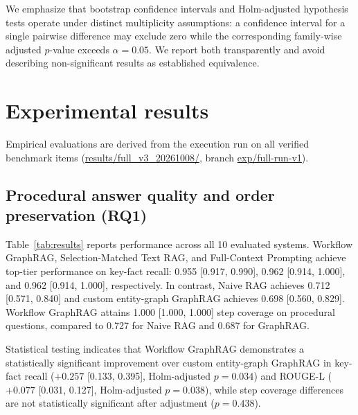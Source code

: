 \documentclass[preprint,10pt]{elsarticle}
\begin{document}
We emphasize that bootstrap confidence intervals and Holm-adjusted hypothesis tests operate under distinct multiplicity assumptions: a confidence interval for a single pairwise difference may exclude zero while the corresponding family-wise adjusted $p$-value exceeds $\alpha = 0.05$. We report both transparently and avoid describing non-significant results as established equivalence.

\section{Experimental results}
\label{sec:results}

Empirical evaluations are derived from the execution run on all \nVerified{} verified benchmark items (\url{results/full_v3_20261008/}, branch \url{exp/full-run-v1}).

\subsection{Procedural answer quality and order preservation (RQ1)}
Table~\ref{tab:results} reports performance across all 10 evaluated systems. Workflow GraphRAG, Selection-Matched Text RAG, and Full-Context Prompting achieve top-tier performance on key-fact recall: 0.955 [0.917, 0.990], 0.962 [0.914, 1.000], and 0.962 [0.914, 1.000], respectively. In contrast, Naive RAG achieves 0.712 [0.571, 0.840] and custom entity-graph GraphRAG achieves 0.698 [0.560, 0.829]. Workflow GraphRAG attains 1.000 [1.000, 1.000] step coverage on procedural questions, compared to 0.727 for Naive RAG and 0.687 for GraphRAG.

\begin{table}[!htbp]
\centering
\caption{Summary of evaluation results across ten system configurations. Key-fact recall (KFR) and false refusal rate are evaluated on 35 answerable questions; procedural metrics (Coverage, TIR, AMR) on 11 procedural questions; refusal accuracy on 5 unanswerable questions; and prompt tokens on all 40 questions. Values are point estimates; full bootstrap 95\% confidence intervals are reported in Supplementary Table~S1. TIR: Topological Inversion Rate; AMR: Actor Mismatch Rate.}
\label{tab:results}
\small
\setlength{\tabcolsep}{2pt}
\resizebox{\textwidth}{!}{%
}
\end{table}

Statistical testing indicates that Workflow GraphRAG demonstrates a statistically significant improvement over custom entity-graph GraphRAG in key-fact recall ($+0.257$ [0.133, 0.395], Holm-adjusted $p=0.034$) and ROUGE-L ($+0.077$ [0.031, 0.127], Holm-adjusted $p=0.038$), while step coverage differences are not statistically significant after adjustment ($p=0.438$).
\end{document}
